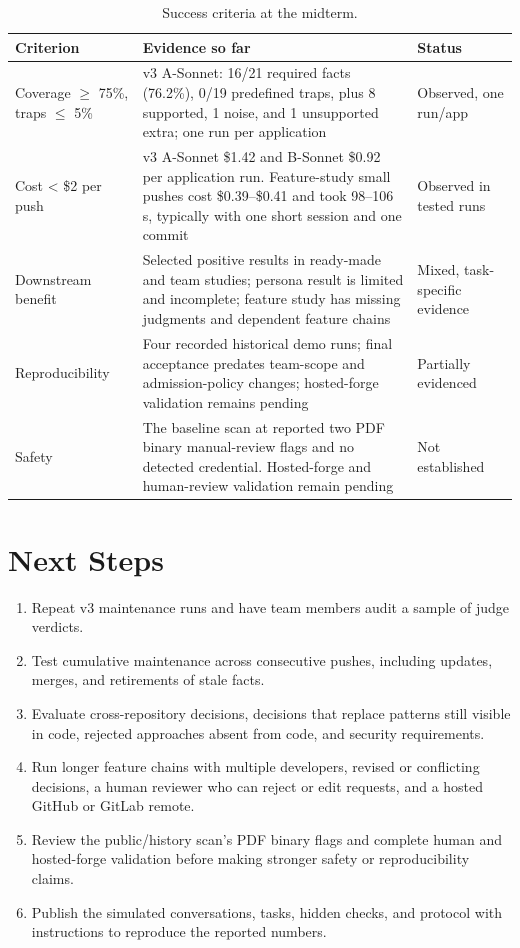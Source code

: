 \begin{table}[H]
\centering
\caption{Success criteria at the midterm.}
\label{tab:criteria}
\small
\begin{tabularx}{\linewidth}{@{}p{3.5cm}Yp{3.2cm}@{}}
\toprule
Criterion & Evidence so far & Status \\
\midrule
Coverage $\geq$ 75\%, traps $\leq$ 5\% & v3 A-Sonnet: 16/21 required facts (76.2\%), 0/19 predefined traps, plus 8 supported, 1 noise, and 1 unsupported extra; one run per application & Observed, one run/app \\
Cost < \$2 per push & v3 A-Sonnet \$1.42 and B-Sonnet \$0.92 per application run. Feature-study small pushes cost \$0.39--\$0.41 and took 98--106 s, typically with one short session and one commit & Observed in tested runs \\
Downstream benefit & Selected positive results in ready-made and team studies; persona result is limited and incomplete; feature study has missing judgments and dependent feature chains & Mixed, task-specific evidence \\
Reproducibility & Four recorded historical demo runs; final acceptance predates team-scope and admission-policy changes; hosted-forge validation remains pending & Partially evidenced \\
Safety & The baseline scan at  reported two PDF binary manual-review flags and no detected credential. Hosted-forge and human-review validation remain pending & Not established \\
\bottomrule
\end{tabularx}
\end{table}
\section{Next Steps}

\begin{enumerate}[nosep]
  \item Repeat v3 maintenance runs and have team members audit a sample of judge verdicts.
  \item Test cumulative maintenance across consecutive pushes, including updates, merges, and retirements of stale facts.
  \item Evaluate cross-repository decisions, decisions that replace patterns still visible in code, rejected approaches absent from code, and security requirements.
  \item Run longer feature chains with multiple developers, revised or conflicting decisions, a human reviewer who can reject or edit requests, and a hosted GitHub or GitLab remote.
  \item Review the public/history scan's PDF binary flags and complete human and hosted-forge validation before making stronger safety or reproducibility claims.
  \item Publish the simulated conversations, tasks, hidden checks, and protocol with instructions to reproduce the reported numbers.
\end{enumerate}

